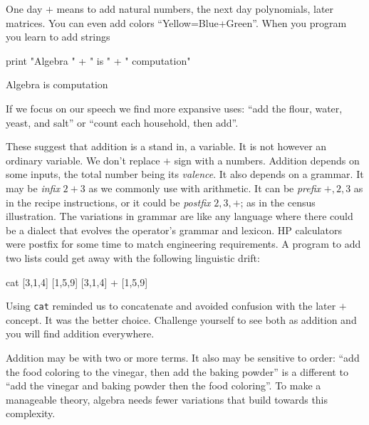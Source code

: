 One day  $+$ means to add natural numbers, the next day 
polynomials, later matrices.  
You can even add colors ``Yellow=Blue+Green''. When you program 
you learn to add strings
\begin{center}
\begin{notebookin}
print "Algebra " + " is " + " computation"
\end{notebookin}
\begin{notebookout}
Algebra is computation
\end{notebookout}
\end{center}
If we focus on our 
speech we find more expansive uses:
``add the flour, water, yeast, and salt'' or  
``count each household, then add''.

These suggest that addition is a stand in, a variable.  It is not however 
an ordinary variable.  We don't replace $+$ sign with a numbers.  
Addition depends on some inputs, the total 
number being its \emph{valence}.    It also depends on a grammar.
It may be \emph{infix} $2+3$ as we commonly 
use with arithmetic.  It can be \emph{prefix} $+,2,3$ as in the recipe instructions,
or it could be \emph{postfix} $2,3,+$; as in the census illustration.  
The variations in grammar are like any language 
where there could be a dialect that evolves the operator's grammar and lexicon.
 HP calculators were postfix for some time to match engineering requirements.
A program to add two lists could get away with the following linguistic drift:
\begin{center}
\begin{notebookin}
cat [3,1,4] [1,5,9]
[3,1,4] + [1,5,9]
\end{notebookin}
\begin{notebookout}[2]
[3,1,4,1,5,9]
[4,6,13]
\end{notebookout}
\end{center}
Using \texttt{cat} reminded us to concatenate and avoided confusion with the
later $+$ concept.  It was the better choice. Challenge yourself to see both as
addition and you will find addition everywhere. 

Addition  may be with two or more terms.  It also may be 
sensitive to order: ``add the food coloring to the vinegar, then add the baking
powder'' is a different to ``add the vinegar and baking powder then the
food coloring''.  To make a manageable theory, algebra needs fewer variations that 
build towards this complexity.

